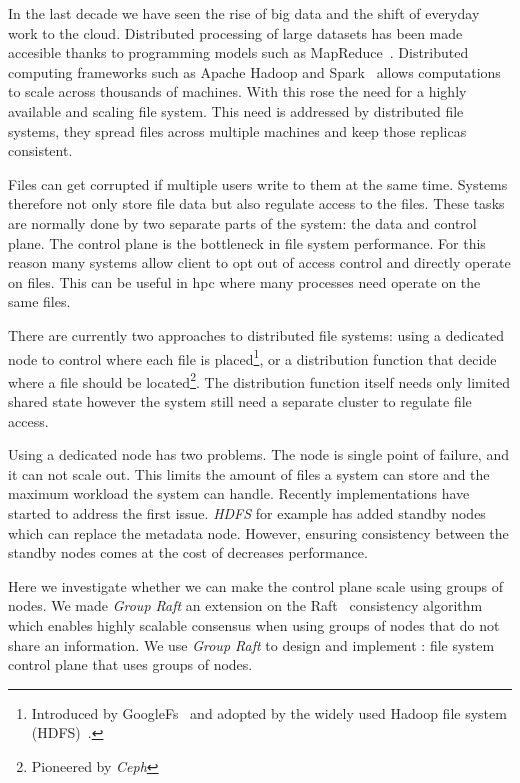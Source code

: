 In the last decade we have seen the rise of big data and the shift of everyday work to the cloud. Distributed processing of large datasets has been made accesible thanks to programming models such as MapReduce~\cite{mapReduce}. Distributed computing frameworks such as Apache Hadoop and Spark~\cite{spark} allows computations to scale across thousands of machines. With this rose the need for a highly available and scaling file system. This need is addressed by distributed file systems, they spread files across multiple machines and keep those replicas consistent. 

Files can get corrupted if multiple users write to them at the same time. Systems therefore not only store file data but also regulate access to the files. These tasks are normally done by two separate parts of the system: the data and control plane. The control plane is the bottleneck in file system performance. For this reason many systems allow client to opt out of access control and directly operate on files. This can be useful in \ac{hpc} where many processes need operate on the same files.

There are currently two approaches to distributed file systems: using a dedicated node to control where each file is placed\footnote{Introduced by GoogleFs~\cite{GFS,GFS_interview} and adopted by the widely used Hadoop file system (HDFS)~\cite{hdfs}.}, or a distribution function that decide where a file should be located\footnote{Pioneered by \textit{Ceph}\cite{ceph}}. The distribution function itself needs only limited shared state however the system still need a separate cluster to regulate file access.

Using a dedicated node has two problems. The node is single point of failure, and it can not scale out. This limits the amount of files a system can store and the maximum workload the system can handle. Recently implementations have started to address the first issue. \textit{HDFS} for example has added standby nodes \cite{hdfs_ha_nfs, hdfs_ha_q} which can replace the metadata node. However, ensuring consistency between the standby nodes comes at the cost of decreases performance.

Here we investigate whether we can make the control plane scale using groups of nodes. We made \textit{Group Raft} an extension on the Raft~\cite{raft} consistency algorithm which enables highly scalable consensus when using groups of nodes that do not share an information. We use \textit{Group Raft} to design and implement \Name{}: file system control plane that uses groups of nodes. 

